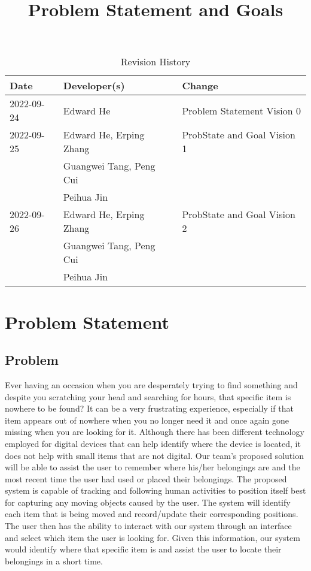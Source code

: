 \documentclass{article}
\title{Problem Statement and Goals\\\progname}
\author{\authname}
\date{}
\begin{document}
\maketitle

\begin{table}[hp]
\caption{Revision History} \label{TblRevisionHistory}
\begin{tabularx}{\textwidth}{llX}
\toprule
\textbf{Date} & \textbf{Developer(s)} & \textbf{Change}\\
\midrule
2022-09-24 & Edward He & Problem Statement Vision 0\\
\hline
2022-09-25 & Edward He, Erping Zhang & ProbState and Goal Vision 1\\
& Guangwei Tang, Peng Cui & \\
& Peihua Jin & \\
\hline
2022-09-26 & Edward He, Erping Zhang & ProbState and Goal Vision 2\\
& Guangwei Tang, Peng Cui & \\
& Peihua Jin & \\

\bottomrule
\end{tabularx}
\end{table}

\section{Problem Statement}


\subsection{Problem}
Ever having an occasion when you are desperately trying to find something and despite you scratching your head and searching for hours, that specific item is nowhere to be found? It can be a very frustrating experience, especially if that item appears out of nowhere when you no longer need it and once again gone missing when you are looking for it. Although there has been different technology employed for digital devices that can help identify where the device is located, it does not help with small items that are not digital. Our team's proposed solution will be able to assist the user to remember where his/her belongings are and the most recent time the user had used or placed their belongings. The proposed system is capable of tracking and following human activities to position itself best for capturing any moving objects caused by the user. The system will identify each item that is being moved and record/update their corresponding positions. The user then has the ability to interact with our system through an interface and select which item the user is looking for. Given this information, our system would identify where that specific item is and assist the user to locate their belongings in a short time. 
\end{document}
